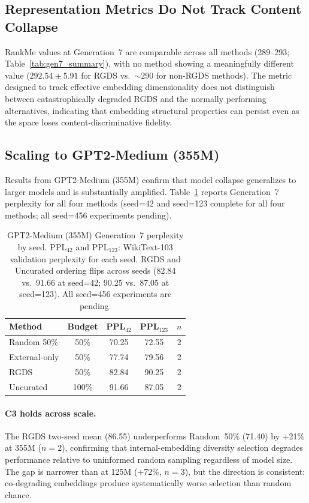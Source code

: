 \subsection{Representation Metrics Do Not Track Content Collapse}
\label{sec:result_rankme}

RankMe values at Generation~7 are comparable across all methods (289--293; Table~\ref{tab:gen7_summary}), with no method showing a meaningfully different value ($292.54 \pm 5.91$ for RGDS vs.\ ${\sim}290$ for non-RGDS methods). The metric designed to track effective embedding dimensionality does not distinguish between catastrophically degraded RGDS and the normally performing alternatives, indicating that embedding structural properties can persist even as the space loses content-discriminative fidelity.

\subsection{Scaling to GPT2-Medium (355M)}
\label{sec:result_scaling}

Results from GPT2-Medium (355M) confirm that model collapse generalizes to larger models and is substantially amplified. Table~\ref{tab:medium_comparison} reports Generation~7 perplexity for all four methods (seed=42 and seed=123 complete for all four methods; all seed=456 experiments pending).%

\begin{table}[t]
\centering
\small
\begin{tabular}{lcccc}
\toprule
Method & Budget & PPL$_{42}$ & PPL$_{123}$ & $n$ \\
\midrule
Random 50\% & 50\% & 70.25 & 72.55 & 2 \\
External-only & 50\% & 77.74 & 79.56 & 2 \\
RGDS & 50\% & 82.84 & 90.25 & 2 \\
Uncurated & 100\% & 91.66 & 87.05 & 2 \\
\bottomrule
\end{tabular}
\caption{GPT2-Medium (355M) Generation~7 perplexity by seed. PPL$_{42}$ and PPL$_{123}$: WikiText-103 validation perplexity for each seed. RGDS and Uncurated ordering flips across seeds (82.84 vs.\ 91.66 at seed=42; 90.25 vs.\ 87.05 at seed=123). All seed=456 experiments are pending.}
\label{tab:medium_comparison}
\end{table}

\paragraph{C3 holds across scale.} The RGDS two-seed mean (86.55) underperforms Random~50\% (71.40) by +21\% at 355M ($n{=}2$), confirming that internal-embedding diversity selection degrades performance relative to uninformed random sampling regardless of model size. The gap is narrower than at 125M (+72\%, $n{=}3$), but the direction is consistent: co-degrading embeddings produce systematically worse selection than random chance.%

